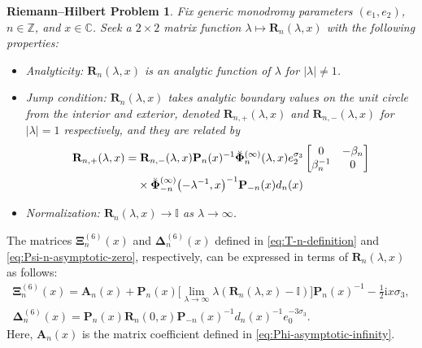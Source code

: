 \documentclass[pdftex]{sigma}
\numberwithin{equation}{section}
\newtheorem{rhp}[Theorem]{Riemann--Hilbert Problem}
\newcommand{\ii}{\mathrm{i}}
\newcommand{\para}[1]{\breve{#1}}
\begin{document}
\begin{rhp}
Fix generic monodromy parameters $( e_1, e_2)$, $n\in\mathbb{Z}$, and $x\in\mathbb{C}$. Seek a $2\times 2$ matrix function $\lambda\mapsto\mathbf{R}_n(\lambda,x)$ with the following properties:
\begin{itemize}\itemsep=0pt
 \item Analyticity: $\mathbf{R}_n(\lambda,x)$ is an analytic function of $\lambda$ for $|\lambda|\neq 1$.
 \item Jump condition:
 $\mathbf{R}_n(\lambda,x)$ takes analytic boundary values on the unit circle from the interior and exterior, denoted $\mathbf{R}_{n,+}(\lambda,x)$ and $\mathbf{R}_{n,-}(\lambda,x)$ for $|\lambda|=1$ respectively, and they are related by
 \begin{align}
 & \mathbf{R}_{n,+}(\lambda,x)= \mathbf{R}_{n,-}(\lambda,x)\mathbf{P}_n(x)^{-1}\para{\mathbf{\Phi}}_n^{(\infty)}(\lambda,x)e_2^{\sigma_3}\begin{bmatrix}0 & -\beta_n\\\beta_n^{-1} & 0\end{bmatrix}\nonumber\\
 &\hphantom{\mathbf{R}_{n,+}(\lambda,x)=}{} \times
 \para{\mathbf{\Phi}}_{-n}^{(\infty)}\bigl(-\lambda^{-1},x\bigr)^{-1}\mathbf{P}_{-n}(x)d_n(x)\label{eq:R-jump}
 \end{align}
 \item Normalization:
 $\mathbf{R}_n(\lambda,x)\to\mathbb{I}$ as $\lambda\to\infty$.
\end{itemize}
\end{rhp}
The matrices $\mathbf{\Xi}_n^{(6)}(x)$ and $\mathbf{\Delta}_n^{(6)}(x)$ defined in \eqref{eq:T-n-definition} and \eqref{eq:Psi-n-asymptotic-zero}, respectively, can be expressed in terms of $\mathbf{R}_n(\lambda,x)$ as follows:
\begin{gather}
 \mathbf{\Xi}_n^{(6)}(x)=\mathbf{A}_n(x)+\mathbf{P}_n(x)\big[\lim_{\lambda\to\infty}\lambda(\mathbf{R}_n(\lambda,x)-\mathbb{I})\big]\mathbf{P}_n(x)^{-1}-\frac{1}{2}\ii x\sigma_3,\nonumber\\
 \mathbf{\Delta}_n^{(6)}(x)=\mathbf{P}_n(x)\mathbf{R}_n(0,x)\mathbf{P}_{-n}(x)^{-1}d_n(x)^{-1}e_0^{-3\sigma_3}.\label{eq:TU-R}
\end{gather}
Here, $\mathbf{A}_n(x)$ is the matrix coefficient defined in \eqref{eq:Phi-asymptotic-infinity}.
\end{document}
